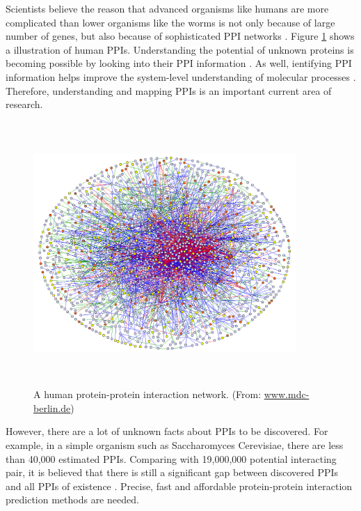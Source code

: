  Scientists believe the reason that advanced organisms like humans are more complicated than lower organisms like the worms is not only because of large number of genes, but also because of sophisticated PPI networks \cite{pitre2008computational}. Figure \ref{fig_ppi_net} shows a illustration of human PPIs.
Understanding the potential of unknown proteins is becoming possible by looking into their PPI information \cite{sharan2007network}. As well, ientifying PPI information helps improve the system-level understanding of molecular processes \cite{levy2008evolution}.
Therefore, understanding and mapping PPIs is an important current area of research.

\begin{figure}[h!]
\begin{center}
\includegraphics[height = 10cm, width = 10cm]{img/pro_inter_net.jpg}
\caption[A human protein-protein interaction network]{A human protein-protein interaction network. (From: \href{https://www.mdc-berlin.de/}{www.mdc-berlin.de})  \label{fig_ppi_net}}
\end{center}
\end{figure}

However, there are a lot of unknown facts about PPIs to be discovered. For example, in a simple organism such as Saccharomyces Cerevisiae, there are less than 40,000 estimated PPIs. Comparing with 19,000,000 potential interacting pair, it is believed that there is still a significant gap between discovered PPIs and all PPIs of existence \cite{jessulat2011recent, sprinzak2003reliable}. Precise, fast and affordable protein-protein interaction prediction methods are needed.

